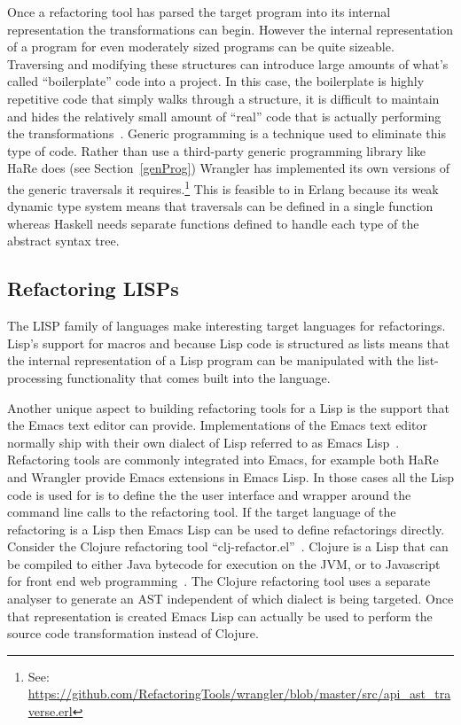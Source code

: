 Once a refactoring tool has parsed the target program into its internal representation the transformations can begin. However the internal representation of a program for even moderately sized programs can be quite sizeable. Traversing and modifying these structures can introduce large amounts of what's called ``boilerplate'' code into a project. In this case, the boilerplate is highly repetitive code that simply walks through a structure, it is difficult to maintain and hides the relatively small amount of ``real'' code that is actually performing the transformations~\citep{syb}. Generic programming is a technique used to eliminate this type of code. Rather than use a third-party generic programming library like HaRe does (see Section~\ref{genProg}) Wrangler has implemented its own versions of the generic traversals it requires.\footnote{See: \url{https://github.com/RefactoringTools/wrangler/blob/master/src/api_ast_traverse.erl}} This is feasible to in Erlang because its weak dynamic type system means that traversals can be defined in a single function whereas Haskell needs separate functions defined to handle each type of the abstract syntax tree. 

\subsection{Refactoring LISPs}

The LISP family of languages make interesting target languages for refactorings. Lisp's support for macros and because Lisp code is structured as lists means that the internal representation of a Lisp program can be manipulated with the list-processing functionality that comes built into the language. 

Another unique aspect to building refactoring tools for a Lisp is the support that the Emacs text editor can provide. Implementations of the Emacs text editor normally ship with their own dialect of Lisp referred to as Emacs Lisp~\citep{emacs}. Refactoring tools are commonly integrated into Emacs, for example both HaRe and Wrangler provide Emacs extensions in Emacs Lisp. In those cases all the Lisp code is used for is to define the the user interface and wrapper around the command line calls to the refactoring tool. If the target language of the refactoring is a Lisp then Emacs Lisp can be used to define refactorings directly. Consider the Clojure refactoring tool ``clj-refactor.el''~\citep{clojureRefac}. Clojure is a Lisp that can be compiled to either Java bytecode for execution on the JVM, or to Javascript for front end web programming~\citep{clojure}. The Clojure refactoring tool uses a separate analyser to generate an AST independent of which dialect is being targeted. Once that representation is created Emacs Lisp can actually be used to perform the source code transformation instead of Clojure.    

